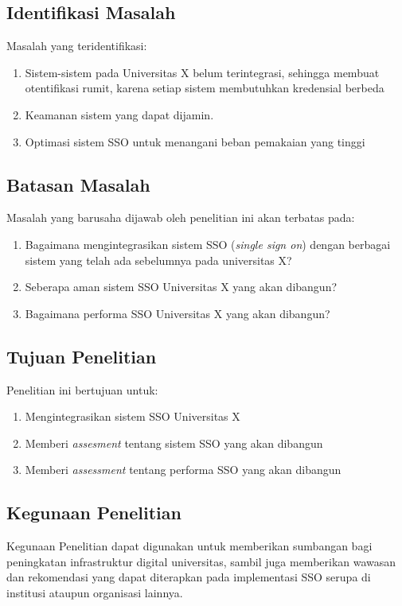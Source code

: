 \documentclass{article}
\begin{document}
\subsection{Identifikasi Masalah}
Masalah yang teridentifikasi:
\begin{enumerate}
    \item Sistem-sistem pada Universitas X belum terintegrasi, sehingga membuat otentifikasi rumit, karena setiap sistem membutuhkan kredensial berbeda
    \item Keamanan sistem yang dapat dijamin.
    \item Optimasi sistem SSO untuk menangani beban pemakaian yang tinggi
\end{enumerate}
\subsection{Batasan Masalah}
Masalah yang barusaha dijawab oleh penelitian ini akan terbatas pada:
\begin{enumerate}
    \item Bagaimana mengintegrasikan sistem SSO (\emph{single sign on}) dengan berbagai sistem yang telah ada sebelumnya pada universitas X?
    \item Seberapa aman sistem SSO Universitas X yang akan dibangun?
    \item Bagaimana performa SSO Universitas X yang akan dibangun?
\end{enumerate}
\subsection{Tujuan Penelitian}
Penelitian ini bertujuan untuk:
\begin{enumerate}
    \item Mengintegrasikan sistem SSO Universitas X
    \item Memberi \emph{assesment} tentang sistem SSO yang akan dibangun
    \item Memberi \emph{assessment} tentang performa SSO yang akan dibangun
\end{enumerate}
\subsection{Kegunaan Penelitian}
Kegunaan Penelitian dapat digunakan untuk  memberikan sumbangan bagi peningkatan infrastruktur digital universitas, sambil juga memberikan wawasan dan rekomendasi yang dapat diterapkan pada implementasi SSO serupa di institusi ataupun organisasi lainnya.
\end{document}
